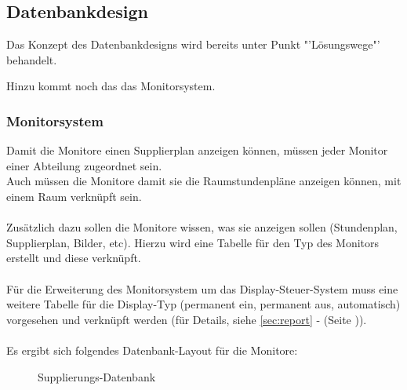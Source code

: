 \subsection{Datenbankdesign}

Das Konzept des Datenbankdesigns wird bereits unter Punkt "'Lösungswege"' behandelt.

Hinzu kommt noch das das Monitorsystem.

\subsubsection{Monitorsystem}

Damit die Monitore einen Supplierplan anzeigen können, müssen jeder Monitor einer Abteilung zugeordnet sein.\\
Auch müssen die Monitore damit sie die Raumstundenpläne anzeigen können, mit einem Raum verknüpft sein.\\
\\
Zusätzlich dazu sollen die Monitore wissen, was sie anzeigen sollen (Stundenplan, Supplierplan, Bilder, etc). Hierzu wird eine Tabelle für den Typ des Monitors erstellt und diese verknüpft.\\
\\ 
Für die Erweiterung des Monitorsystem um das Display-Steuer-System muss eine weitere Tabelle für die Display-Typ (permanent ein, permanent aus, automatisch) vorgesehen und verknüpft werden (für Details, siehe \autoref{sec:report} -   (Seite \pageref{sec:report})).\\
\\
Es ergibt sich folgendes Datenbank-Layout für die Monitore:
\begin{figure}[H]
\centering
{}
\caption{Supplierungs-Datenbank}
\end{figure}
